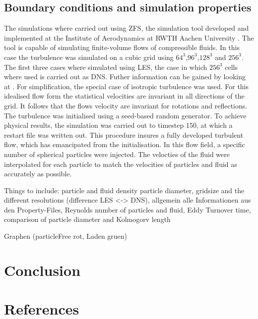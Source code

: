 \documentclass[a4paper,10pt]{article}
\numberwithin{equation}{section} %
\begin{document}
\subsection{Boundary conditions and simulation properties}
The simulations where carried out using ZFS, the simulation tool developed and implemented at the Institute of Aerodynamics at RWTH Aachen University 
\cite{anAdaptiveMultilevelMultigridFormulationForCartesianHierarchicalGridMethods} \cite{aStrictlyConservativeCartesianCutCellMethodForCompressibleViscousFlowsOnAdaptiveGrids}. 
The tool is capable of simulating finite-volume flows of compressible fluids. 
In this case the turbulence was simulated on a cubic grid using $64^3$,$96^3$,$128^3$ and $256^3$. The first three cases where simulated using LES, 
the case in which $256^3$ cells where used is carried out as DNS. Futher information can be gained by looking at \cite[p.344-357 for DNS and p. 558-639 for LES]{turbulentFlows}.
For simplification, the special case of isotropic turbulence was used. For this idealised flow form the statistical 
velocities are invariant in all directions of the grid. It follows that the flows velocity are invariant for rotations and reflections. 
The turbulence was initialised using a seed-based random generator. To achieve physical results, the simulation was carried out  to timestep 150, 
at which a restart file was written out. This procedure insures a fully developed turbulent 
flow, which has emancipated from the initialisation. In this flow field, a specific number of spherical particles were injected. 
The velocties of the fluid were interpolated for each particle to match the velocities of particles and fluid as accurately as possible.

Things to include: particle and fluid density particle diameter, gridsize and the different resolutions (difference LES <-> DNS), allgemein alle Informationen aus den Property-Files, Reynolds number of particles and fluid, Eddy Turnover time, comparison of particle diameter and Kolmogorv length 

Graphen (particleFree rot, Laden gruen)
\pagebreak
\section{Conclusion}
\pagebreak
\section{References}
\nocite{*} %
\pagebreak
\end{document}
